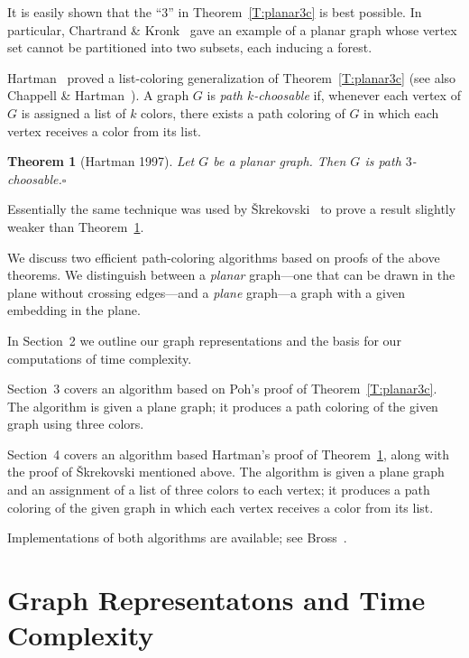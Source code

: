 \documentclass[12pt,letterpaper]{article}
\theoremstyle{plain}
\newtheorem{theorem}[lemma]{Theorem}         %
\theoremstyle{definition}
\newcommand{\ggcqedsymbol}{$\square$}
\newcommand{\ggcqed}{\hbox{}\nobreak\hbox{\quad\ggcqedsymbol}}
\newcommand{\ggcnopf}{\ggcqed}
\newcommand{\defterm}[1]{\emph{#1}} %
\begin{document}
It is easily shown that the ``$3$'' in Theorem~\ref{T:planar3c}
is best possible.
In particular, Chartrand \& Kronk~\cite[Section~3]{ChKr1969}
gave an example of a planar graph whose vertex set cannot be partitioned
into two subsets, each inducing a forest.

Hartman~\cite[Thm.~4.1]{Har1997}
proved a list-coloring generalization of Theorem~\ref{T:planar3c}
(see also Chappell \& Hartman~\cite[Thm.~2.1]{ChHa2017prep}).
A graph $G$ is \defterm{path $k$-choosable} if,
whenever each vertex of $G$ is assigned a list of $k$ colors,
there exists a path coloring of $G$ in which each vertex receives
a color from its list.

\begin{theorem}[Hartman 1997] \label{T:planar3}
Let $G$ be a planar graph.
Then $G$ is path $3$-choosable.\ggcnopf\end{theorem}

Essentially the same technique was used by
\v{S}krekovski~\cite[Thm.~2.2b]{Skr1999}
to prove a result slightly weaker than Theorem~\ref{T:planar3}.


\medskip

We discuss two efficient path-coloring algorithms
based on proofs of the above theorems.
We distinguish between a \defterm{planar} graph---one that
can be drawn in the plane without crossing edges---and
a \defterm{plane} graph---a graph with a given embedding
in the plane.

In Section~2 we outline our graph representations
and the basis for our computations of time complexity.

Section~3 covers an algorithm
based on Poh's proof of Theorem~\ref{T:planar3c}.
The algorithm is given a plane graph;
it produces a path coloring of the given graph
using three colors.

Section~4 covers an algorithm
based Hartman's proof of Theorem~\ref{T:planar3},
along with the proof of \v{S}krekovski mentioned above.
The algorithm is given a plane graph
and an assignment of a list of three colors to each vertex;
it produces a path coloring of the given graph
in which each vertex receives a color from its list.

Implementations of both algorithms are available;
see Bross~\cite{Bro2017}.


\section{Graph Representatons and Time Complexity}
\end{document}
